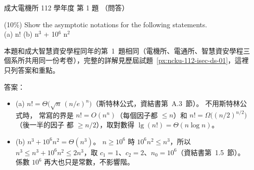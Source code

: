 \begin{pastexam}[label={px:ncku-112-ee-ds-01}]{成大電機所 112 學年度 第 1 題}
（問答）

(10\%) Show the asymptotic notations for the following statements.\\
(a) n! \qquad (b) n$^3$ + 10$^6$ n$^2$
\end{pastexam}

\begin{pastsoln}
本題和成大智慧資安學程同年的第~1~題相同（電機所、電通所、智慧資安學程三個系所共用同一份考卷），完整的詳解見歷屆試題~\ref{px:ncku-112-isec-ds-01}，這裡只列答案和重點。

答案：
\begin{itemize}
\item (a) $n! = \Theta\bigl(\sqrt{n}\,(n/e)^{n}\bigr)$（斯特林公式，資結書第~A.3~節）。 不用斯特林公式時，
常寫的界是 $n! = O(n^{n})$（每個因子都 $\le n$）和 $n! = \Omega\bigl((n/2)^{n/2}\bigr)$（後一半的因子
都 $\ge n/2$），取對數得 $\lg(n!) = \Theta(n \log n)$。
\item (b) $n^{3} + 10^{6} n^{2} = \Theta(n^{3})$。 $n \ge 10^{6}$ 時 $10^{6} n^{2} \le n^{3}$，所以
$n^{3} \le n^{3} + 10^{6} n^{2} \le 2n^{3}$，取 $c_1 = 1$、$c_2 = 2$、$n_0 = 10^{6}$（資結書第~1.5~節）。
係數 $10^{6}$ 再大也只是常數，不影響階。
\end{itemize}
\end{pastsoln}
